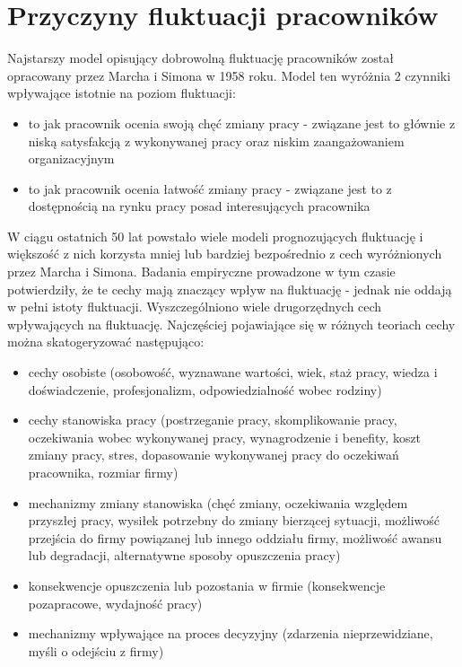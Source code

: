 \section{Przyczyny fluktuacji pracowników}\label{sec:czynniki-wplywajace-na-fluktuacje}

Najstarszy model opisujący dobrowolną fluktuację pracowników został opracowany przez Marcha i Simona w 1958 roku.
Model ten wyróżnia 2 czynniki wpływające istotnie na poziom fluktuacji\cite{wozniak-2012}:
\begin{itemize}
    \item to jak pracownik ocenia swoją chęć zmiany pracy - związane jest to głównie z niską satysfakcją z wykonywanej pracy oraz niskim zaangażowaniem organizacyjnym
    \item to jak pracownik ocenia łatwość zmiany pracy - związane jest to z dostępnością na rynku pracy posad interesujących pracownika
    \end{itemize}
W ciągu ostatnich 50 lat powstało wiele modeli prognozujących fluktuację i większość z nich korzysta mniej lub bardziej bezpośrednio z cech wyróżnionych przez Marcha i Simona.
Badania empiryczne prowadzone w tym czasie potwierdziły, że te cechy mają znaczący wpływ na fluktuację - jednak nie oddają w pełni istoty fluktuacji.
Wyszczególniono wiele drugorzędnych cech wpływających na fluktuację.
Najczęściej pojawiające się w różnych teoriach cechy można skatogeryzować następująco\cite{steel-2009}:
\begin{itemize}
    \item cechy osobiste (osobowość, wyznawane wartości, wiek, staż pracy, wiedza i doświadczenie, profesjonalizm, odpowiedzialność wobec rodziny)
    \item cechy stanowiska pracy (postrzeganie pracy, skomplikowanie pracy, oczekiwania wobec wykonywanej pracy, wynagrodzenie i benefity, koszt zmiany pracy, stres, dopasowanie wykonywanej pracy do oczekiwań pracownika, rozmiar firmy)
    \item mechanizmy zmiany stanowiska (chęć zmiany, oczekiwania względem przyszłej pracy, wysiłek potrzebny do zmiany bierzącej sytuacji, możliwość przejścia do firmy powiązanej lub innego oddziału firmy, możliwość awansu lub degradacji, alternatywne sposoby opuszczenia pracy)
    \item konsekwencje opuszczenia lub pozostania w firmie (konsekwencje pozapracowe, wydajność pracy)
    \item mechanizmy wpływające na proces decyzyjny (zdarzenia nieprzewidziane, myśli o odejściu z firmy)
    \end{itemize}

